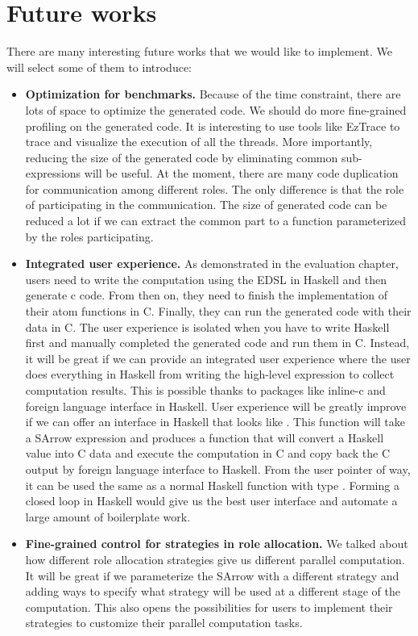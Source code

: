 \section{Future works}
There are many interesting future works that we would like to implement. We will select some of them to introduce:
\begin{itemize}
    \item \textbf{Optimization for benchmarks.} Because of the time constraint, there are lots of space to optimize the generated code. We should do more fine-grained profiling on the generated code. It is interesting to use tools like EzTrace to trace and visualize the execution of all the threads. More importantly, reducing the size of the generated code by eliminating common sub-expressions will be useful. At the moment, there are many code duplication for communication among different roles. The only difference is that the role of participating in the communication. The size of generated code can be reduced a lot if we can extract the common part to a function parameterized by the roles participating. 
    \item \textbf{Integrated user experience.} As demonstrated in the evaluation chapter, users need to write the computation using the EDSL in Haskell and then generate c code. From then on, they need to finish the implementation of their atom functions in C. Finally, they can run the generated code with their data in C. The user experience is isolated when you have to write Haskell first and manually completed the generated code and run them in C. Instead, it will be great if we can provide an integrated user experience where the user does everything in Haskell from writing the high-level expression to collect computation results. This is possible thanks to packages like inline-c and foreign language interface in Haskell. User experience will be greatly improve if we can offer an interface in Haskell that looks like . This function will take a SArrow expression and produces a function that will convert a Haskell value into C data and execute the computation in C and copy back the C output by foreign language interface to Haskell. From the user pointer of way, it can be used the same as a normal Haskell function with type . Forming a closed loop in Haskell would give us the best user interface and automate a large amount of boilerplate work.
    \item \textbf{Fine-grained control for strategies in role allocation.} We talked about how different role allocation strategies give us different parallel computation. It will be great if we parameterize the SArrow with a different strategy and adding ways to specify what strategy will be used at a different stage of the computation. This also opens the possibilities for users to implement their strategies to customize their parallel computation tasks.

\end{itemize}
